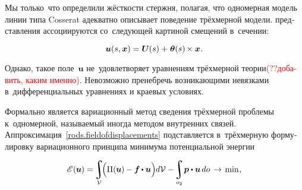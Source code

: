 \begin{otherlanguage}{russian}

Мы только~что определили жёсткости стержня, полагая, что одномерная модель линии типа Cosserat адекватно описывает поведение трёхмерной модели.
 представления ассоциируются со~следующей картиной смещений в~сечении:

\nopagebreak\vspace{-0.1em}\begin{equation}\label{rods.fieldofdisplacements}
\bm{u}(s,\bm{x}) = \bm{U}\hspace{-0.1ex}(s) + \hspace{.15ex} \bm{\theta}(s) \hspace{-0.2ex} \times \bm{x}
\hspace{.1ex} .
\end{equation}

\vspace{-0.1em}\noindent
Однако, такое поле~$\bm{u}$ не~удовлетворяет уравнениям трёхмерной теории\textcolor{red}{(??добавить, каким именно)}.
Невозможно пренебречь возникающими невязками в~дифференциальных уравнениях и краевых условиях.

Формально  является вариационный метод сведения трёхмерной проблемы к~одномерной, называемый иногда методом внутренних связей.
Аппроксимация~\eqref{rods.fieldofdisplacements} подставляется в~трёхмерную формулировку вариационного принципа минимума потенциальной энергии~

\nopagebreak\vspace{-0.1em}\begin{equation*}
\potentialenergyfunctional \hspace{.2ex} (\hspace{-0.1ex}\bm{u}\hspace{-0.1ex}) = \hspace{-0.2ex}
\displaystyle\integral\displaylimits_{\mathcal{V}} \hspace{-0.5ex}
\Bigl(
\potentialenergydensity (\hspace{-0.1ex}\bm{u}\hspace{-0.1ex}) \hspace{-0.1ex} - \bm{f} \hspace{-0.1ex} \dotp \bm{u} \Bigr) \hspace{-0.1ex} d\mathcal{V}
- \hspace{-0.3ex}
\displaystyle\integral\displaylimits_{o_2} \hspace{-0.32ex} \bm{p} \dotp \bm{u} \hspace{.33ex} do \hspace{.2ex}
\hspace{.1ex}\to\hspace{.25ex} \mathrm{min}
\hspace{.1ex} ,
\end{equation*}


\end{otherlanguage}
